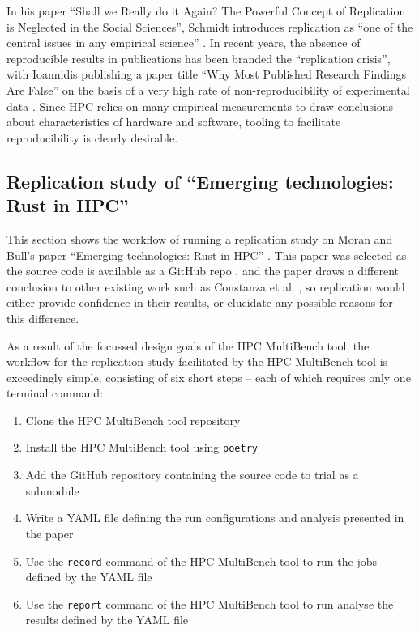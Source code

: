 In his paper ``Shall we Really do it Again? The Powerful Concept of Replication is Neglected in the Social Sciences'', Schmidt introduces replication as ``one of the central issues in any empirical science''
\cite{schmidtShallWeReally2009}. In recent years, the absence of reproducible results in publications has been branded the ``replication crisis'', with Ioannidis publishing a paper title ``Why Most Published Research Findings Are False'' on the basis of a very high rate of non-reproducibility of experimental data \cite{ioannidisWhyMostPublished2005}. Since \acrshort{HPC} relies on many empirical measurements to draw conclusions about characteristics of hardware and software, tooling to facilitate reproducibility is clearly desirable.

\subsection{Replication study of ``Emerging technologies: Rust in HPC''}
\label{ssec:hpc-multibench-replication-study}

This section shows the workflow of running a replication study on Moran and Bull's paper ``Emerging technologies: Rust in HPC'' \cite{moranEmergingTechnologiesRust2023}. This paper was selected as the source code is available as a GitHub repo \cite{Lmoran94Eurocc_cfdCFD}, and the paper draws a different conclusion to other existing work such as Constanza et al. \cite{costanzoPerformanceVsProgramming2021}, so replication would either provide confidence in their results, or elucidate any possible reasons for this difference.

As a result of the focussed design goals of the HPC MultiBench tool, the workflow for the replication study facilitated by the HPC MultiBench tool is exceedingly simple, consisting of six short steps -- each of which requires only one terminal command:

\begin{enumerate}
    \item Clone the HPC MultiBench tool repository
    \item Install the HPC MultiBench tool using \texttt{poetry}
    \item Add the GitHub repository containing the source code to trial as a submodule
    \item Write a YAML file defining the run configurations and analysis presented in the paper
    \item Use the \texttt{record} command of the HPC MultiBench tool to run the jobs defined by the YAML file
    \item Use the \texttt{report} command of the HPC MultiBench tool to run analyse the results defined by the YAML file
\end{enumerate}


